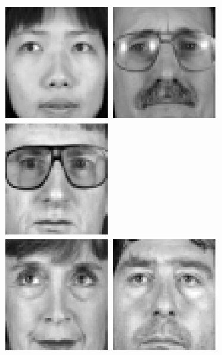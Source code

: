 \begin{figure}
\begin{center}
\includegraphics[scale=0.12]{ch4/figures/XM2VTS_46.png}
\includegraphics[scale=0.12]{ch4/figures/XM2VTS_47.png}
\includegraphics[scale=0.12]{ch4/figures/XM2VTS_48.png}\\
\includegraphics[scale=0.12]{ch4/figures/XM2VTS_49.png}
\includegraphics[scale=0.12]{ch4/figures/XM2VTS_50.png}

\end{center}
\end{figure}
